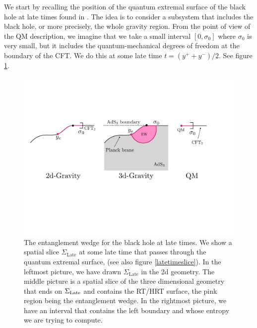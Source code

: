 \documentclass[11pt]{article}
\begin{document}
We start by recalling the position of the quantum extremal surface of the black hole at late times found in  \cite{Penington:2019npb,Almheiri:2019psf}. 
The idea is to consider a subsystem that includes the black hole, or more precisely, the whole gravity region.
From the point of view of the QM description, we imagine that we take a small interval $[0,\sigma_0]$ where $\sigma_0$ is very small, but it includes the quantum-mechanical degrees of freedom at the boundary of the CFT. 
We do this at some late time $t = (y^+ + y^-)/2$.
See figure \ref{LateEntanglementWedges}. 
\begin{figure}[ht]
    \begin{center}
    \includegraphics[scale=.5]{Figures/LateEntanglementWedges}
    \end{center}
    \caption{
     The entanglement wedge for the black hole at late times. 
     We show a spatial slice $\Sigma_\text{Late}$ at some late time that passes through the quantum extremal surface, (see also figure \ref{latetimeslice}).
     In the leftmost picture, we have drawn $\Sigma_\text{Late}$ in the 2d geometry.
     The middle picture is a spatial slice of the three dimensional geometry that ends on $\Sigma_{\rm Late}$ and contains the RT/HRT surface, the pink region being the entanglement wedge. 
     In the rightmost picture, we have an interval that contains the left boundary and whose entropy we are trying to compute.}
    \label{LateEntanglementWedges}
\end{figure}
\end{document}
